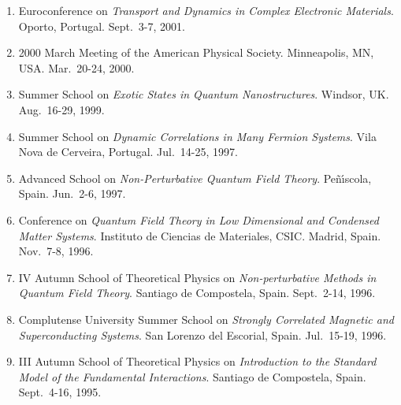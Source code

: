 \documentclass{article}
\begin{document}
\begin{enumerate}
\item
Euroconference on 
{\it Transport and Dynamics in Complex Electronic Materials}.
Oporto, Portugal. 
Sept.~3-7, 2001. 

\item 
2000 March Meeting of the American Physical Society. 
Minneapolis, MN, USA. 
Mar.~20-24, 2000.

\item 
Summer School on 
{\it Exotic States in Quantum Nanostructures}.
Windsor, UK. 
Aug.~16-29, 1999.

\item 
Summer School on 
{\it Dynamic Correlations in Many Fermion Systems}. 
Vila Nova de Cerveira, Portugal. 
Jul.~14-25, 1997.

\item
Advanced School on {\it Non-Perturbative Quantum Field Theory}. 
Pe\~n\'{\i}scola, Spain. 
Jun.~2-6, 1997.

\item 
Conference on 
{\it Quantum Field Theory in Low Dimensional and Condensed Matter Systems}.
Instituto de Ciencias de Materiales, CSIC. Madrid, Spain. 
Nov.~7-8, 1996.

\item  
IV Autumn School of Theoretical Physics on
{\it Non-perturbative Methods in Quantum Field Theory}.
Santiago de Compostela, Spain. 
Sept.~2-14, 1996.

\item  
Complutense University Summer School on
{\it Strongly Correlated Magnetic and Superconducting Systems}.
San Lorenzo del Escorial, Spain. 
Jul.~15-19, 1996.

\item  
III Autumn School of Theoretical Physics on
{\it Introduction to the Standard Model of the Fundamental Interactions}.
Santiago de Compostela, Spain. 
Sept.~4-16, 1995. 
\end{enumerate}

\newpage

\end{document}
